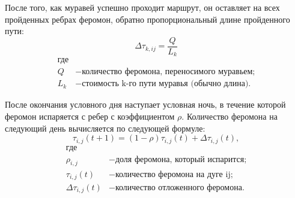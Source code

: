\documentclass[a4paper,12pt]{report}
\begin{document}
После того, как муравей успешно проходит маршрут, он оставляет на всех пройденных ребрах феромон, обратно пропорциональный длине пройденного пути:
\begin{equation}\label{form:add} 
    \Delta \tau _{k, ij}= {\frac{Q}{L_{k}}}
\end{equation}
\begin{align*}
    \text{где} \\
    Q &- \text{количество феромона, переносимого муравьем;} \\
    L_{k} &- \text{стоимость k-го пути муравья (обычно длина).}
\end{align*}

После окончания условного дня наступает условная ночь, в течение которой феромон испаряется с ребер с коэффициентом $\rho$. Количество феромона на следующий день вычисляется по следующей формуле:
\begin{equation}\label{form:eva} 
    \tau _{i,j}(t+1)=(1-\rho )\tau _{i,j}(t)+\Delta \tau _{i,j}(t),
\end{equation}
\begin{align*}
    \text{где} \\
    \rho _{i,j} &- \text{доля феромона, который испарится;} \\
    \tau _{i,j}(t) &- \text{количество феромона на дуге ij;} \\
    \Delta \tau _{i,j}(t) &- \text{количество отложенного феромона.}
\end{align*}
\end{document}
